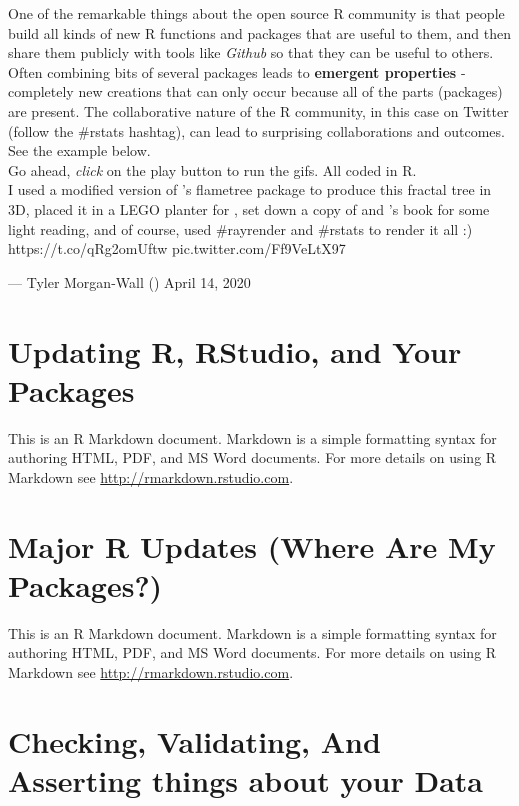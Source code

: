 \documentclass[
]{book}
\begin{document}
One of the remarkable things about the open source R community is that people build all kinds of new R functions and packages that are useful to them, and then share them publicly with tools like \emph{Github} so that they can be useful to others. Often combining bits of several packages leads to \textbf{emergent properties} - completely new creations that can only occur because all of the parts (packages) are present. The collaborative nature of the R community, in this case on Twitter (follow the \#rstats hashtag), can lead to surprising collaborations and outcomes.\\
See the example below.\\
Go ahead, \emph{click} on the play button to run the gifs. All coded in R.\\

I used a modified version of \citet{djnavarro}'s flametree package to produce this fractal tree in 3D, placed it in a LEGO planter for \citet{ryantimpe}, set down a copy of \citet{skyetetra} and \citet{robinson_es}'s book for some light reading, and of course, used \#rayrender and \#rstats to render it all :) https://t.co/qRg2omUftw pic.twitter.com/Ff9VeLtX97

--- Tyler Morgan-Wall (\citet{tylermorganwall}) April 14, 2020

\hypertarget{updating-r-rstudio-and-your-packages}{%
\chapter{Updating R, RStudio, and Your Packages}\label{updating-r-rstudio-and-your-packages}}

This is an R Markdown document. Markdown is a simple formatting syntax for authoring HTML, PDF, and MS Word documents. For more details on using R Markdown see \url{http://rmarkdown.rstudio.com}.

\hypertarget{major-r-updates-where-are-my-packages}{%
\chapter{Major R Updates (Where Are My Packages?)}\label{major-r-updates-where-are-my-packages}}

This is an R Markdown document. Markdown is a simple formatting syntax for authoring HTML, PDF, and MS Word documents. For more details on using R Markdown see \url{http://rmarkdown.rstudio.com}.

\hypertarget{checking-validating-and-asserting-things-about-your-data}{%
\chapter{Checking, Validating, And Asserting things about your Data}\label{checking-validating-and-asserting-things-about-your-data}}
\end{document}
